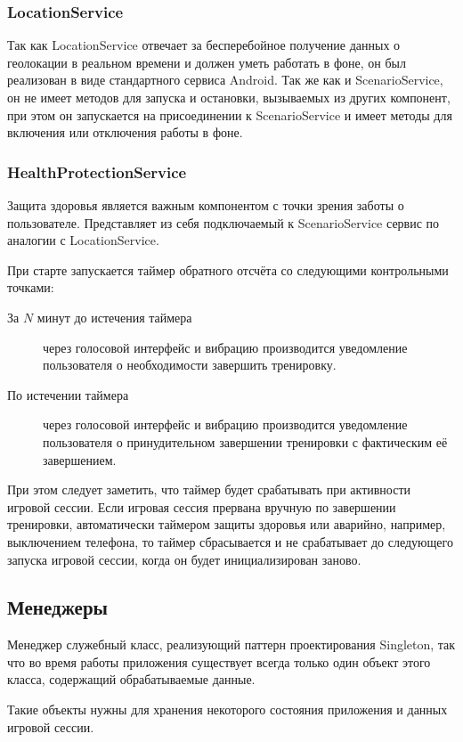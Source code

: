 \subsubsection*{LocationService}
Так как LocationService отвечает за бесперебойное получение данных о геолокации в реальном времени и должен уметь работать в фоне, он был реализован в виде стандартного сервиса Android. Так же как и ScenarioService, он не имеет методов для запуска и остановки, вызываемых из других компонент, при этом он запускается на присоединении к ScenarioService и имеет методы для включения или отключения работы в фоне.

\subsubsection*{HealthProtectionService}
Защита здоровья является важным компонентом с точки зрения заботы о пользователе. Представляет из себя подключаемый к ScenarioService сервис по аналогии с LocationService. 

При старте запускается таймер обратного отсчёта со следующими контрольными точками:
\begin{description}
	\item[За $N$ минут до истечения таймера] через голосовой интерфейс и вибрацию производится уведомление пользователя о необходимости завершить тренировку.
	\item[По истечении таймера] через голосовой интерфейс и вибрацию производится уведомление пользователя о принудительном завершении тренировки с фактическим её завершением.
\end{description}
\smallskip
При этом следует заметить, что таймер будет срабатывать при активности игровой сессии. 
Если игровая сессия прервана вручную по завершении тренировки, автоматически таймером защиты здоровья или аварийно, например, выключением телефона, то таймер сбрасывается и не срабатывает до следующего запуска игровой сессии, когда он будет инициализирован заново.

\subsection{Менеджеры}
Менеджер \textemdash\space служебный класс, реализующий паттерн проектирования Singleton, так что во время работы приложения существует всегда только один объект этого класса, содержащий обрабатываемые данные.

Такие объекты нужны для хранения некоторого состояния приложения и данных игровой сессии.

